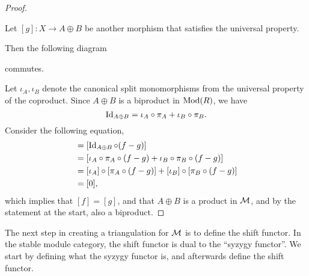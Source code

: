 \begin{proof}
\begin{center}
    \end{center}
    Let \( [g]: X \to A \oplus B \) be another morphism that satisfies the universal property.

    Then the following diagram
    \begin{center}
    \end{center}
    commutes.

    Let \( \iota_A, \iota_B \) denote the canonical split monomorphisms from the universal property of the coproduct. Since \( A \oplus B \) is a biproduct in \( \operatorname{Mod}(R) \), we have
    \[
        \operatorname{Id}_{A \oplus B} = \iota_A \circ \pi_A + \iota_B \circ \pi_B.
    \]
    Consider the following equation,
    \begin{align*}
        [f - g] &= [\Id_{A \oplus B} \circ (f - g)] \\
        &= [\iota_A \circ \pi_A \circ (f - g) + \iota_B \circ \pi_B \circ (f - g)] \\
        &= [\iota_A] \circ [\pi_A \circ (f - g)] + [\iota_B] \circ [\pi_B \circ (f - g)] \\
        &= [0],
    \end{align*}
    which implies that \( [f] = [g] \), and that \( A \oplus B \) is a product in \( {\mathcal{M}} \), and by the statement at the start, also a biproduct.
\end{proof}

The next step in creating a triangulation for \( {\mathcal{M}} \) is to define the shift functor. In the stable module category, the shift functor is dual to the ``syzygy functor''. We start by defining what the syzygy functor is, and afterwards define the shift functor.

